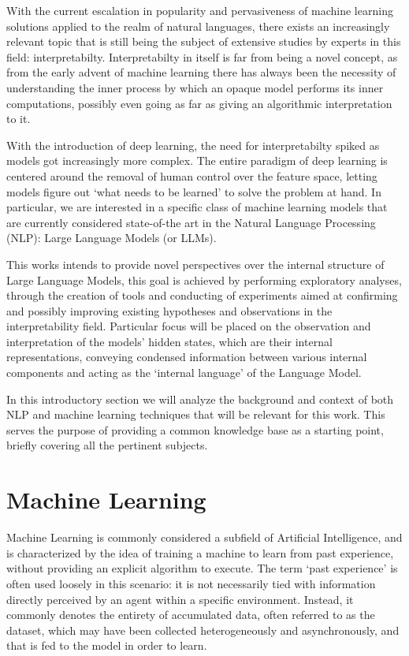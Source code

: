 With the current escalation in popularity and pervasiveness of machine learning solutions applied to the realm of natural languages, there exists an increasingly relevant topic that is still being the subject of extensive studies by experts in this field: interpretabilty.
Interpretabilty in itself is far from being a novel concept, as from the early advent of machine learning there has always been the necessity of understanding the inner process by which an opaque model performs its inner computations, possibly even going as far as giving an algorithmic interpretation to it. 

With the introduction of deep learning, the need for interpretabilty spiked as models got increasingly more complex.
The entire paradigm of deep learning is centered around the removal of human control over the feature space, letting models figure out `what needs to be learned' to solve the problem at hand.
In particular, we are interested in a specific class of machine learning models that are currently considered state-of-the art in the Natural Language Processing (NLP): Large Language Models (or LLMs).

This works intends to provide novel perspectives over the internal structure of Large Language Models, this goal is achieved by performing exploratory analyses, through the creation of tools and conducting of experiments aimed at confirming and possibly improving existing hypotheses and observations in the interpretability field.
Particular focus will be placed on the observation and interpretation of the models' hidden states, which are their internal representations, conveying condensed information between various internal components and acting as the `internal language' of the Language Model.

In this introductory section we will analyze the background and context of both NLP and machine learning techniques that will be relevant for this work.
This serves the purpose of providing a common knowledge base as a starting point, briefly covering all the pertinent subjects.

\section{Machine Learning}

Machine Learning is commonly considered a subfield of Artificial Intelligence, and is characterized by the idea of training a machine to learn from past experience, without providing an explicit algorithm to execute.
The term `past experience' is often used loosely in this scenario: it is not necessarily tied with information directly perceived by an agent within a specific environment.
Instead, it commonly denotes the entirety of accumulated data, often referred to as the dataset, which may have been collected heterogeneously and asynchronously, and that is fed to the model in order to learn.

